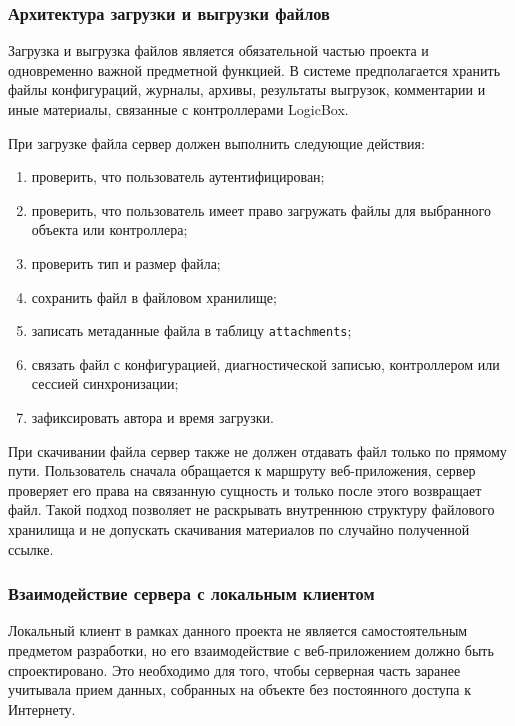 \subsubsection{Архитектура загрузки и выгрузки файлов}

Загрузка и выгрузка файлов является обязательной частью проекта и одновременно
важной предметной функцией. В системе предполагается хранить файлы конфигураций,
журналы, архивы, результаты выгрузок, комментарии и иные материалы, связанные с
контроллерами LogicBox.

При загрузке файла сервер должен выполнить следующие действия:
\begin{enumerate}
    \item проверить, что пользователь аутентифицирован;
    \item проверить, что пользователь имеет право загружать файлы для выбранного объекта или контроллера;
    \item проверить тип и размер файла;
    \item сохранить файл в файловом хранилище;
    \item записать метаданные файла в таблицу \texttt{attachments};
    \item связать файл с конфигурацией, диагностической записью, контроллером или сессией синхронизации;
    \item зафиксировать автора и время загрузки.
\end{enumerate}

При скачивании файла сервер также не должен отдавать файл только по прямому
пути. Пользователь сначала обращается к маршруту веб-приложения, сервер
проверяет его права на связанную сущность и только после этого возвращает файл.
Такой подход позволяет не раскрывать внутреннюю структуру файлового хранилища и
не допускать скачивания материалов по случайно полученной ссылке.

\subsubsection{Взаимодействие сервера с локальным клиентом}

Локальный клиент в рамках данного проекта не является самостоятельным предметом
разработки, но его взаимодействие с веб-приложением должно быть спроектировано.
Это необходимо для того, чтобы серверная часть заранее учитывала прием данных,
собранных на объекте без постоянного доступа к Интернету.

